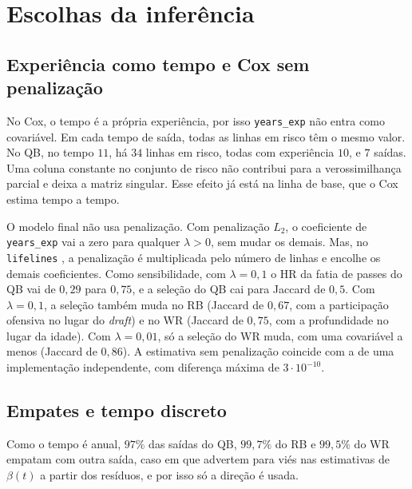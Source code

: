 
\section{Escolhas da inferência}
\label{sec:apend_inferencia}

\subsection{Experiência como tempo e Cox sem penalização}
\label{subsec:apend_years_exp}

No Cox, o tempo é a própria experiência, por isso \texttt{years\_exp} não entra como covariável. Em cada tempo de saída, todas as linhas em risco têm o mesmo valor. No QB, no tempo $11$, há $34$ linhas em risco, todas com experiência $10$, e $7$ saídas. Uma coluna constante no conjunto de risco não contribui para a verossimilhança parcial e deixa a matriz singular. Esse efeito já está na linha de base, que o Cox estima tempo a tempo.

O modelo final não usa penalização. Com penalização $L_2$, o coeficiente de \texttt{years\_exp} vai a zero para qualquer $\lambda > 0$, sem mudar os demais. Mas, no \texttt{lifelines} \citep{lifelines}, a penalização é multiplicada pelo número de linhas e encolhe os demais coeficientes. Como sensibilidade, com $\lambda = 0{,}1$ o HR da fatia de passes do QB vai de $0{,}29$ para $0{,}75$, e a seleção do QB cai para Jaccard de $0{,}5$. Com $\lambda = 0{,}1$, a seleção também muda no RB (Jaccard de $0{,}67$, com a participação ofensiva no lugar do \textit{draft}) e no WR (Jaccard de $0{,}75$, com a profundidade no lugar da idade). Com $\lambda = 0{,}01$, só a seleção do WR muda, com uma covariável a menos (Jaccard de $0{,}86$). A estimativa sem penalização coincide com a de uma implementação independente, com diferença máxima de $3\cdot10^{-10}$.

\subsection{Empates e tempo discreto}
\label{subsec:apend_empates}

Como o tempo é anual, $97\%$ das saídas do QB, $99{,}7\%$ do RB e $99{,}5\%$ do WR empatam com outra saída, caso em que \citet{grambsch1994} advertem para viés nas estimativas de $\beta(t)$ a partir dos resíduos, e por isso só a direção é usada.

